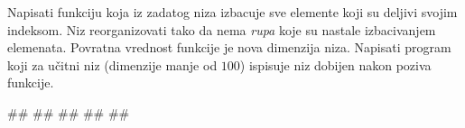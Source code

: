 \begin{Exercise}[label=vp.bez_resenja_2] 
Napisati funkciju koja iz zadatog niza izbacuje sve elemente koji su deljivi svojim indeksom. Niz reorganizovati tako da nema \emph{rupa} koje su nastale izbacivanjem elemenata. Povratna vrednost funkcije je nova dimenzija niza. Napisati program koji za učitni niz (dimenzije manje od $100$) ispisuje niz dobijen nakon poziva funkcije. %



\begin{miditest}
\begin{upotreba}{1}
#\naslovInt#
##
##
##
##
\end{upotreba}
\end{miditest}
\end{Exercise}

\ifresenja
\begin{Answer}[ref=vp.bez_resenja_2]
\end{Answer}
\fi



%


